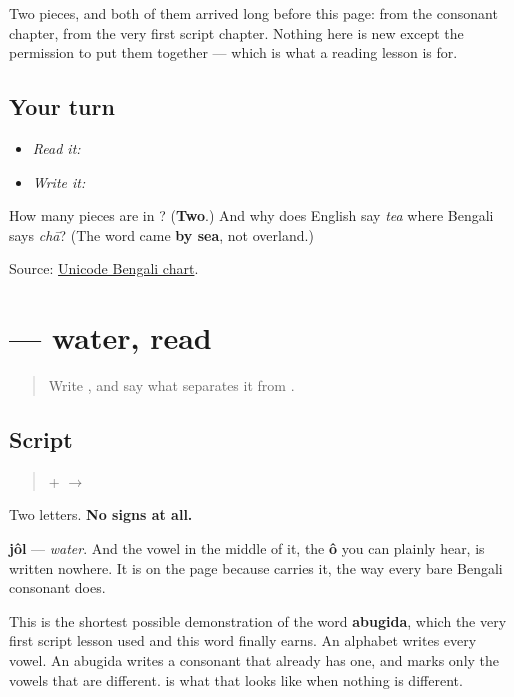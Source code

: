 Two pieces, and both of them arrived long before this page: \textbf{} from the consonant chapter, \textbf{} from the very first script chapter. Nothing here is new except the permission to put them together — which is what a reading lesson is for.

\subsection*{Your turn}
\begin{itemize}
\raggedright
  \item \emph{Read it:} 
  \item \emph{Write it:} 
\end{itemize}

\begin{tcolorbox}[breakable,colback=teal!4,colframe=teal!35!black,title={Before you move on}]
How many pieces are in \textbf{}? (\textbf{Two}.) And why does English say \emph{tea} where Bengali says \emph{chā}? (The word came \textbf{by sea}, not overland.)

Source: \href{https://www.unicode.org/charts/PDF/U0980.pdf}{Unicode Bengali chart}.
\end{tcolorbox}
\section[jôl]{ — water, read}

\label{lesson:BN-W04-jol-read}



\begin{quote}
Write \textbf{}, and say what separates it from \textbf{}.
\end{quote}

\subsection*{Script}
\begin{quote}
\textbf{} + \textbf{} $\to$ \textbf{}
\end{quote}

Two letters. \textbf{No signs at all.}

\textbf{jôl} — \emph{water}. And the vowel in the middle of it, the \textbf{ô} you can plainly hear, is written nowhere. It is on the page because \textbf{} carries it, the way every bare Bengali consonant does.

This is the shortest possible demonstration of the word \textbf{abugida}, which the very first script lesson used and this word finally earns. An alphabet writes every vowel. An abugida writes a consonant that already has one, and marks only the vowels that are different. \textbf{} is what that looks like when nothing is different.

